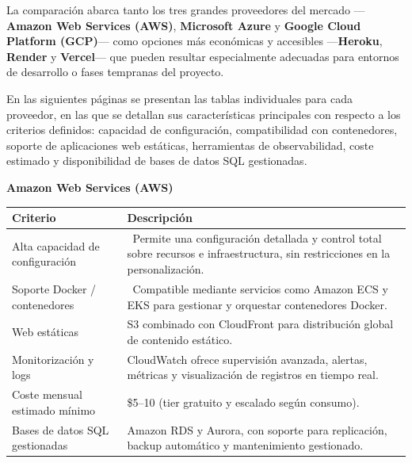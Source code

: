 La comparación abarca tanto los tres grandes proveedores del mercado —\textbf{Amazon Web Services (AWS)}, \textbf{Microsoft Azure} y \textbf{Google Cloud Platform (GCP)}— como opciones más económicas y accesibles —\textbf{Heroku}, \textbf{Render} y \textbf{Vercel}— que pueden resultar especialmente adecuadas para entornos de desarrollo o fases tempranas del proyecto.

En las siguientes páginas se presentan las tablas individuales para cada proveedor, en las que se detallan sus características principales con respecto a los criterios definidos: capacidad de configuración, compatibilidad con contenedores, soporte de aplicaciones web estáticas, herramientas de observabilidad, coste estimado y disponibilidad de bases de datos SQL gestionadas.

\begin{center}
	\renewcommand{\arraystretch}{1.2}
	\setlength{\tabcolsep}{6pt}
	\textbf{Amazon Web Services (AWS)}\\[4pt]
	\begin{tabularx}{\textwidth}{|l|X|}
		\hline
		\textbf{Criterio}               & \textbf{Descripción}                                                                                                                       \\
		\hline
		Alta capacidad de configuración & \checkmark\ Permite una configuración detallada y control total sobre recursos e infraestructura, sin restricciones en la personalización. \\
		\hline
		Soporte Docker / contenedores   & \checkmark\ Compatible mediante servicios como Amazon ECS y EKS para gestionar y orquestar contenedores Docker.                            \\
		\hline
		Web estáticas                   & S3 combinado con CloudFront para distribución global de contenido estático.                                                                \\
		\hline
		Monitorización y logs           & CloudWatch ofrece supervisión avanzada, alertas, métricas y visualización de registros en tiempo real.                                     \\
		\hline
		Coste mensual estimado mínimo   & \$5--10 (tier gratuito y escalado según consumo).                                                                                          \\
		\hline
		Bases de datos SQL gestionadas  & Amazon RDS y Aurora, con soporte para replicación, backup automático y mantenimiento gestionado.                                           \\
		\hline
	\end{tabularx}
\end{center}

